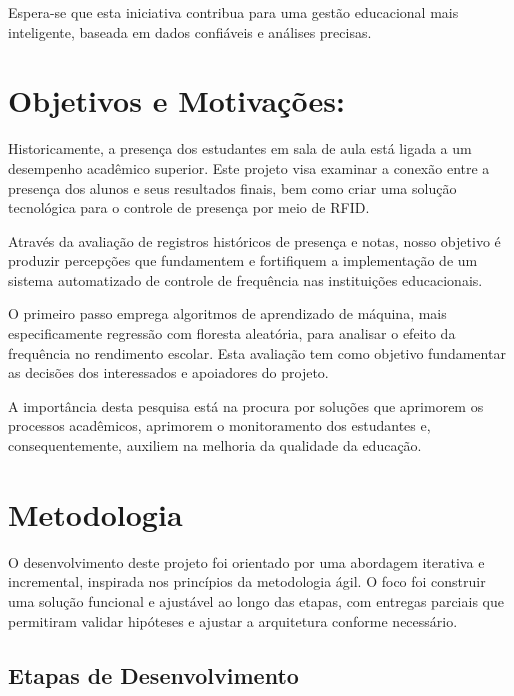\documentclass[
  letterpaper,
]{article}
\begin{document}
Espera-se que esta iniciativa contribua para uma gestão educacional mais
inteligente, baseada em dados confiáveis e análises precisas.


\chapter{Objetivos e Motivações:}\label{objetivos-e-motivauxe7uxf5es}

Historicamente, a presença dos estudantes em sala de aula está ligada a
um desempenho acadêmico superior. Este projeto visa examinar a conexão
entre a presença dos alunos e seus resultados finais, bem como criar uma
solução tecnológica para o controle de presença por meio de RFID.

Através da avaliação de registros históricos de presença e notas, nosso
objetivo é produzir percepções que fundamentem e fortifiquem a
implementação de um sistema automatizado de controle de frequência nas
instituições educacionais.

O primeiro passo emprega algoritmos de aprendizado de máquina, mais
especificamente regressão com floresta aleatória, para analisar o efeito
da frequência no rendimento escolar. Esta avaliação tem como objetivo
fundamentar as decisões dos interessados e apoiadores do projeto.

A importância desta pesquisa está na procura por soluções que aprimorem
os processos acadêmicos, aprimorem o monitoramento dos estudantes e,
consequentemente, auxiliem na melhoria da qualidade da educação.


\chapter{Metodologia}\label{metodologia}

O desenvolvimento deste projeto foi orientado por uma abordagem
iterativa e incremental, inspirada nos princípios da metodologia ágil. O
foco foi construir uma solução funcional e ajustável ao longo das
etapas, com entregas parciais que permitiram validar hipóteses e ajustar
a arquitetura conforme necessário.

\section{Etapas de Desenvolvimento}\label{etapas-de-desenvolvimento}
\end{document}
